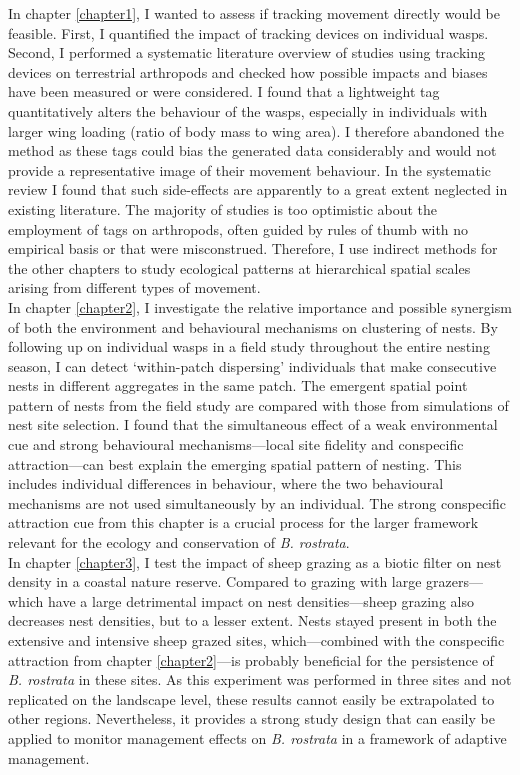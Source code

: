 \documentclass[10pt, twoside]{book} %
\begin{document}
In chapter \ref{chapter1}, I wanted to assess if tracking movement directly would be feasible. First, I quantified the impact of tracking devices on individual wasps. Second, I performed a systematic literature overview of studies using tracking devices on terrestrial arthropods and checked how possible impacts and biases have been measured or were considered. I found that a lightweight tag quantitatively alters the behaviour of the wasps, especially in individuals with larger wing loading (ratio of body mass to wing area). I therefore abandoned the method as these tags could bias the generated data considerably and would not provide a representative image of their movement behaviour. In the systematic review I found that such side-effects are apparently to a great extent neglected in existing literature. The majority of studies is too optimistic about the employment of tags on arthropods, often guided by rules of thumb with no empirical basis or that were misconstrued. Therefore, I use indirect methods for the other chapters to study ecological patterns at hierarchical spatial scales arising from different types of movement.\\

In chapter \ref{chapter2}, I investigate the relative importance and possible synergism of both the environment and behavioural mechanisms on clustering of nests. By following up on individual wasps in a field study throughout the entire nesting season, I can detect `within-patch dispersing' individuals that make consecutive nests in different aggregates in the same patch. The emergent spatial point pattern of nests from the field study are compared with those from simulations of nest site selection. I found that the simultaneous effect of a weak environmental cue and strong behavioural mechanisms---local site fidelity and conspecific attraction---can best explain the emerging spatial pattern of nesting. This includes individual differences in behaviour, where the two behavioural mechanisms are not used simultaneously by an individual. The strong conspecific attraction cue from this chapter is a crucial process for the larger framework relevant for the ecology and conservation of \textit{B. rostrata}.\\

In chapter \ref{chapter3}, I test the impact of sheep grazing as a biotic filter on nest density in a coastal nature reserve. Compared to grazing with large grazers---which have a large detrimental impact on nest densities---sheep grazing also decreases nest densities, but to a lesser extent. Nests stayed present in both the extensive and intensive sheep grazed sites, which---combined with the conspecific attraction from chapter \ref{chapter2}---is probably beneficial for the persistence of \textit{B. rostrata} in these sites. As this experiment was performed in three sites and not replicated on the landscape level, these results cannot easily be extrapolated to other regions. Nevertheless, it provides a strong study design that can easily be applied to monitor management effects on \textit{B. rostrata} in a framework of adaptive management.\\
\end{document}
